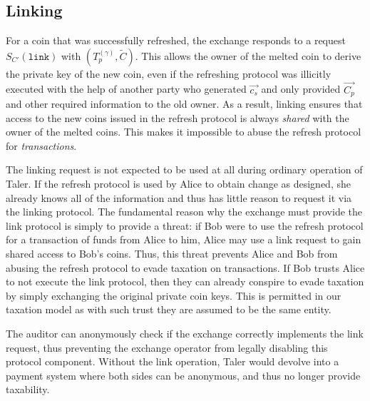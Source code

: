 \documentclass{llncs}
\begin{document}
%

\subsection{Linking}


For a coin that was successfully refreshed, the exchange responds to a
request $S_{C'}(\mathtt{link})$ with $(T^{(\gamma)}_p, \widetilde{C})$.
%
This allows the owner of the melted coin to derive the private key of
the new coin, even if the refreshing protocol was illicitly executed
with the help of another party who generated $\vec{c_s}$ and only
provided $\vec{C_p}$ and other required information to the old owner.
As a result, linking ensures that access to the new coins issued in
the refresh protocol is always {\em shared} with the owner of the
melted coins.  This makes it impossible to abuse the refresh protocol
for {\em transactions}.

The linking request is not expected to be used at all during ordinary
operation of Taler.  If the refresh protocol is used by Alice to
obtain change as designed, she already knows all of the information
and thus has little reason to request it via the linking protocol.
The fundamental reason why the exchange must provide the link protocol
is simply to provide a threat: if Bob were to use the refresh protocol
for a transaction of funds from Alice to him, Alice may use a link
request to gain shared access to Bob's coins. Thus, this threat
prevents Alice and Bob from abusing the refresh protocol to evade
taxation on transactions. If Bob trusts Alice to not execute the link
protocol, then they can already conspire to evade taxation by simply
exchanging the original private coin keys.  This is permitted in our
taxation model as with such trust they are assumed to be the same
entity.

The auditor can anonymously check if the exchange correctly implements the
link request, thus preventing the exchange operator from legally disabling
this protocol component.  Without the link operation, Taler would
devolve into a payment system where both sides can be anonymous, and
thus no longer provide taxability.
\end{document}
